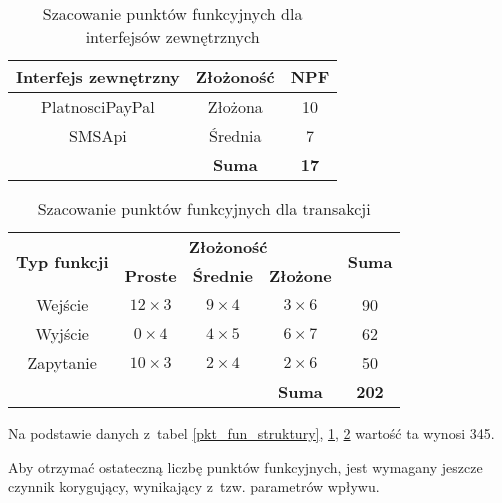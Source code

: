 \documentclass[12pt,leqno,twoside]{mwart}
\begin{document}
\begin{table}[h]
	\centering
	\caption{Szacowanie punktów funkcyjnych dla interfejsów zewnętrznych}
		\rule{0pt}{3ex}
		\renewcommand{\arraystretch}{1.2}
		\begin{tabular}{c|c|c|}
		\hline
		\multicolumn{1}{|c|}{\textbf{Interfejs zewnętrzny}} & \textbf{Złożoność} & \textbf{NPF} \\ \hline
		\multicolumn{1}{|c|}{PlatnosciPayPal} 	& Złożona 	& 10 \\ \hline
		\multicolumn{1}{|c|}{SMSApi} 		& Średnia 	& 7 \\ \hline
					& \textbf{Suma}	& \textbf{17} \\ \cline{2-3}
		\end{tabular}
	\label{pkt_fun_zew}
\end{table}
\begin{table}[h]
	\centering
	\caption{Szacowanie punktów funkcyjnych dla transakcji}
		\renewcommand{\arraystretch}{1.2}
		\rule{0pt}{3ex}
		\begin{tabular}{ccc|c|c|}
		\hline
		
		\multicolumn{1}{|c|}{\multirow{2}{*}{\textbf{Typ funkcji}}}	& \multicolumn{3}{c|}{\textbf{Złożoność}}	&	\multirow{2}{*}{\textbf{Suma}} \\ \cline{2-4}
		\multicolumn{1}{|c|}{} & \multicolumn{1}{c|}{\textbf{Proste}}	& \textbf{Średnie} &	\textbf{Złożone} & \\ \hline
		\multicolumn{1}{|c|}{Wejście} 		& \multicolumn{1}{c|}{$12 \times 3$} & $9 \times 4$ & $3 \times 6$ & 90 \\ \hline
		\multicolumn{1}{|c|}{Wyjście}		& \multicolumn{1}{c|}{$0 \times 4$} & $4 \times 5$ & $6 \times 7$ & 62 \\ \hline
		\multicolumn{1}{|c|}{Zapytanie}		& \multicolumn{1}{c|}{$10 \times 3$} & $2 \times 4$ & $2 \times 6$ & 50 \\ \hline
			&	&	& \textbf{Suma}	& \textbf{202} \\ \cline{4-5}
		\end{tabular}
	\label{pkt_fun_trans}
\end{table}
Na podstawie danych z~tabel \ref{pkt_fun_struktury}, \ref{pkt_fun_zew}, \ref{pkt_fun_trans} wartość ta wynosi 345.

Aby otrzymać ostateczną liczbę punktów funkcyjnych, jest wymagany jeszcze czynnik korygujący, wynikający z~tzw. parametrów wpływu.
\end{document}

